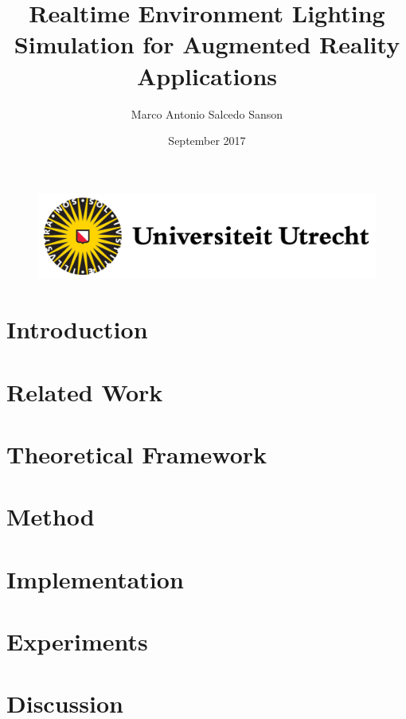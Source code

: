 \documentclass{report}
\title{Realtime Environment Lighting Simulation for Augmented Reality Applications}
\author{Marco Antonio Salcedo Sanson }
\date{September 2017}
\begin{document}
\begin{figure}[t]
\includegraphics[scale = 0.5]{Figures/uu-logo.png}
\end{figure}

\maketitle
\clearpage

\tableofcontents{}
\clearpage

\chapter{Introduction}



\chapter{Related Work}


\chapter{Theoretical Framework}


\chapter{Method}


\chapter{Implementation}


\chapter{Experiments}


\chapter{Discussion}


\clearpage


\nocite{*}

\end{document}
